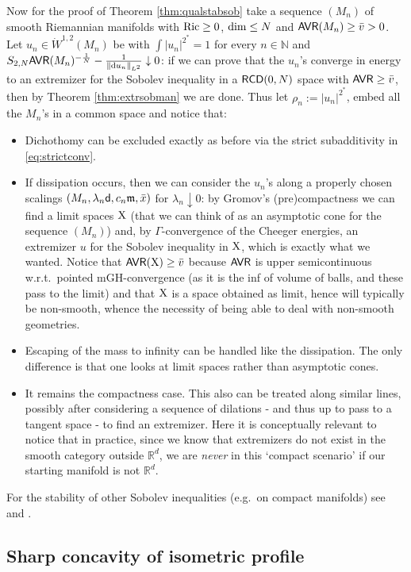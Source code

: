 \documentclass[11pt]{article}
\numberwithin{equation}{section}
\newcommand{\N}{\mathbb{N}}
\newcommand{\R}{\mathbb{R}}
\newcommand{\X}{{\rm X}}
\newcommand{\sfd}{{\sf d}}
\newcommand{\mm}{{\mathfrak m}}
\newcommand{\RCD}{{\sf RCD}}
\renewcommand{\d}{{\rm d}}
\newcommand{\AVR}{{\sf AVR}}
\begin{document}
Now for the proof of Theorem \ref{thm:qualstabsob} take a sequence $(M_n)$ of smooth Riemannian manifolds with ${\rm Ric}\geq 0$, ${\rm dim}\leq N$ and $\AVR(M_n)\geq \bar v>0$. Let  $u_n\in\dot W^{1,2}(M_n)$ be with $\int|u_n|^{2^*}=1$ for every $n\in\N$ and $
S_{2,N}\AVR(M_n)^{-\frac1N}-\frac{1}{\|\d u_n\|_{L^2}}\downarrow0$: if we can prove that the $u_n$'s converge in energy to an extremizer for the Sobolev inequality in a $\RCD(0,N)$ space with $\AVR\geq \bar v$, then by Theorem \ref{thm:extrsobman} we are done. Thus let  $\rho_n:=|u_n|^{2^*}$, embed all the $M_n$'s in a common space and notice that:
\begin{itemize}
\item[-] Dichothomy can be excluded exactly as before via the strict subadditivity in \eqref{eq:strictconv}.
 
\item[-]If dissipation occurs, then we can consider the $u_n$'s along a properly chosen scalings $(M_n,\lambda_n\sfd,c_n\mm,\bar x)$ for $\lambda_n\downarrow 0$: by Gromov's (pre)compactness we can find a limit spaces $\X$ (that we can think of as an asymptotic cone for the sequence $(M_n)$) and, by $\Gamma$-convergence of the Cheeger energies, an extremizer $u$ for the Sobolev inequality in $\X$, which is exactly what we wanted. Notice that $\AVR(\X)\geq\bar v$ because $\AVR$ is upper semicontinuous w.r.t.\ pointed mGH-convergence (as it is the inf of volume of balls, and these pass to the limit) and that $\X$  is a space obtained as limit, hence will typically be non-smooth, whence the necessity of being able to deal with non-smooth geometries.
 

\item[-] Escaping of the mass to infinity can be handled like the dissipation. The only difference is that one looks at limit spaces rather than asymptotic cones.
 

\item[-] It remains the compactness case. This also can be treated along similar lines, possibly after considering a sequence of dilations - and thus up to pass to a tangent space - to find an extremizer. Here it is conceptually relevant to notice that in practice, since we know that extremizers do not exist in the smooth category outside $\R^d$, we are \emph{never} in this `compact scenario' if our starting manifold is not $\R^d$.
\end{itemize}
For the stability of other Sobolev inequalities (e.g.\ on compact manifolds) see \cite{NoVi22} and \cite{NobiliViolo22}.
\subsection{Sharp concavity of isometric profile}
\end{document}
